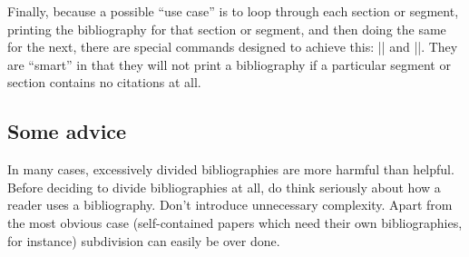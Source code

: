 Finally, because a possible ``use case'' is to loop through each section
or segment, printing the bibliography for that section or segment, and
then doing the same for the next, there are special commands designed to
achieve this: |\bibbysection| and |\bibbysegment|. They are ``smart'' in
that they will not print a bibliography if a particular segment or
section contains no citations at all.

\subsection{Some advice}

In many cases, excessively divided bibliographies are more harmful than
helpful. Before deciding to divide bibliographies at all, do think
seriously about how a reader uses a bibliography. Don't introduce
unnecessary complexity. Apart from the most obvious case (self-contained
papers which need their own bibliographies, for instance) subdivision
can easily be over done.
